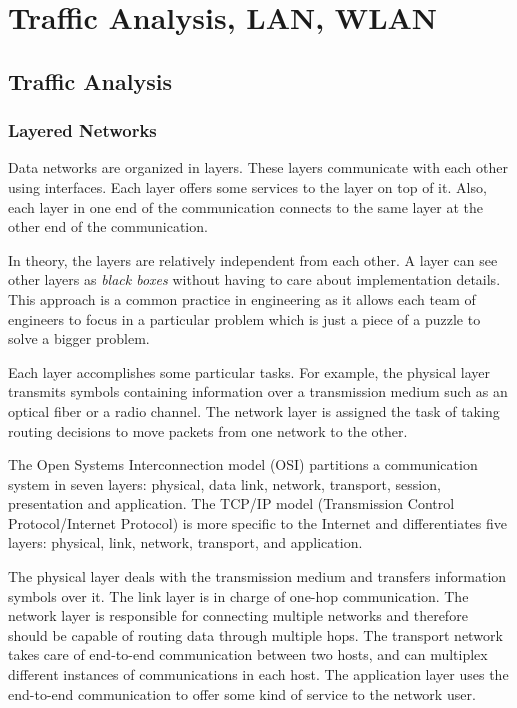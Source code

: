 \chapter{Traffic Analysis, LAN, WLAN}

\section{Traffic Analysis}

\subsection{Layered Networks}
Data networks are organized in layers.
These layers communicate with each other using interfaces.
Each layer offers some services to the layer on top of it.
Also, each layer in one end of the communication connects to the same layer at the other end of the communication.

In theory, the layers are relatively independent from each other.
A layer can see other layers as \emph{black boxes} without having to care about implementation details.
This approach is a common practice in engineering as it allows each team of engineers to focus in a particular problem which is just a piece of a puzzle to solve a bigger problem.

Each layer accomplishes some particular tasks.
For example, the physical layer transmits symbols containing information over a transmission medium such as an optical fiber or a radio channel.
The network layer is assigned the task of taking routing decisions to move packets from one network to the other.

The Open Systems Interconnection model (OSI) partitions a communication system in seven layers: physical, data link, network, transport, session, presentation and application.
The TCP/IP model (Transmission Control Protocol/Internet Protocol) is more specific to the Internet and differentiates five layers: physical, link, network, transport, and application.

The physical layer deals with the transmission medium and transfers information symbols over it.
The link layer is in charge of one-hop communication.
The network layer is responsible for connecting multiple networks and therefore should be capable of routing data through multiple hops.
The transport network takes care of end-to-end communication between two hosts, and can multiplex different instances of communications in each host.
The application layer uses the end-to-end communication to offer some kind of service to the network user.

